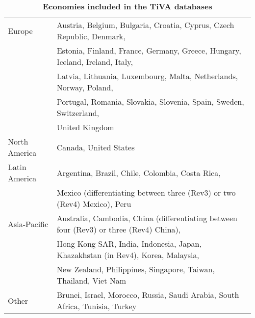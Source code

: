 \documentclass[11pt,a4paper]{article}
\begin{document}
\begin{table}[!h]
\begin{threeparttable}
\centering
\centering
\caption{\small{\textbf{Economies included in the TiVA databases}}}
\small
\begin{tabular}{ll}
\hline\hline
Europe & Austria, Belgium, Bulgaria, Croatia, Cyprus, Czech Republic, Denmark,\\
& Estonia, Finland, France, Germany, Greece, Hungary, Iceland, Ireland, Italy,\\
& Latvia, Lithuania, Luxembourg, Malta, Netherlands, Norway, Poland,\\
&Portugal, Romania, Slovakia, Slovenia, Spain, Sweden, Switzerland,\\
& United Kingdom\\
North  America& Canada, United States\\
Latin America & Argentina, Brazil, Chile, Colombia, Costa Rica, \\ 
&Mexico (differentiating between three (Rev3) or two (Rev4) Mexico), Peru\\
Asia-Pacific & Australia, Cambodia, China (differentiating between four (Rev3) or three (Rev4) China), \\
& Hong Kong SAR, India, Indonesia, Japan, Khazakhstan (in Rev4), Korea, Malaysia, \\
& New Zealand, Philippines, Singapore, Taiwan, Thailand, Viet Nam\\
Other & Brunei, Israel, Morocco, Russia, Saudi Arabia, South Africa, Tunisia, Turkey\\
\hline\hline
\end{tabular} 
\label{tab:tiva}
\end{threeparttable}
\end{table} 
\end{document}
